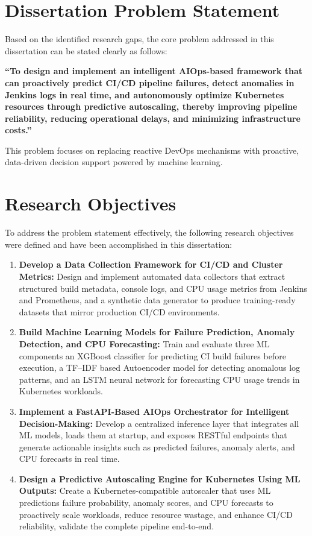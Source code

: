\documentclass[a4paper,14pt,onecolumn]{report}
\begin{document}
\section{Dissertation Problem Statement}

Based on the identified research gaps, the core problem addressed in this dissertation can be stated clearly as follows:

\textbf{``To design and implement an intelligent AIOps-based framework that can proactively predict CI/CD pipeline failures, detect anomalies in Jenkins logs in real time, and autonomously optimize Kubernetes resources through predictive autoscaling, thereby improving pipeline reliability, reducing operational delays, and minimizing infrastructure costs.''}

This problem focuses on replacing reactive DevOps mechanisms with proactive, data-driven decision support powered by machine learning.

\section{Research Objectives}
To address the problem statement effectively, the following research objectives were defined and have been accomplished in this dissertation:
\begin{enumerate}
    \item \textbf{Develop a Data Collection Framework for CI/CD and Cluster Metrics:} Design and implement automated data collectors that extract structured build metadata, console logs, and CPU usage metrics from Jenkins and Prometheus, and a synthetic data generator to produce training-ready datasets that mirror production CI/CD environments.

    \item \textbf{Build Machine Learning Models for Failure Prediction, Anomaly Detection, and CPU Forecasting:} Train and evaluate three ML components an XGBoost classifier for predicting CI build failures before execution, a TF--IDF based Autoencoder model for detecting anomalous log patterns, and an LSTM neural network for forecasting CPU usage trends in Kubernetes workloads.

    \item \textbf{Implement a FastAPI-Based AIOps Orchestrator for Intelligent Decision-Making:} Develop a centralized inference layer that integrates all ML models, loads them at startup, and exposes RESTful endpoints that generate actionable insights such as predicted failures, anomaly alerts, and CPU forecasts in real time.

    \item \textbf{Design a Predictive Autoscaling Engine for Kubernetes Using ML Outputs:} Create a Kubernetes-compatible autoscaler that uses ML predictions failure probability, anomaly scores, and CPU forecasts to proactively scale workloads, reduce resource wastage, and enhance CI/CD reliability, validate the complete pipeline end-to-end.
\end{enumerate}
\end{document}
